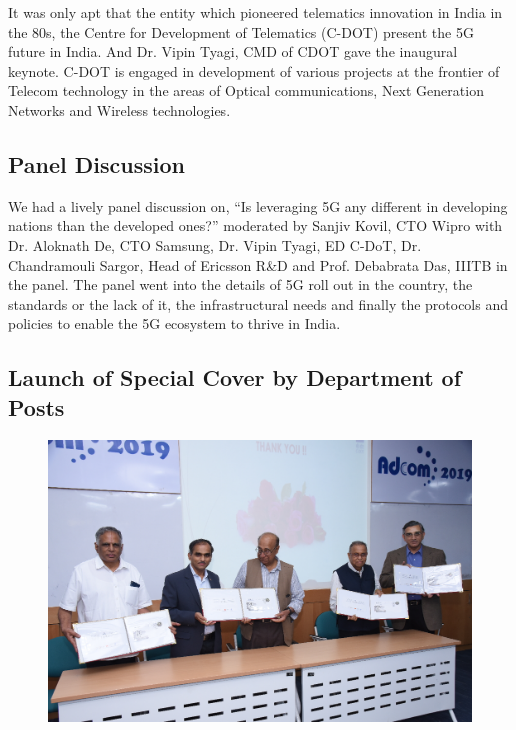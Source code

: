 \begin{multicols}{2}
It was only apt that the entity which pioneered telematics innovation in India in the 80s, the Centre for Development of Telematics (C-DOT) present the 5G future in India. And Dr. Vipin Tyagi, CMD of CDOT gave the inaugural keynote. C-DOT is engaged in development of various projects at the frontier of Telecom technology in the areas of Optical communications, Next Generation Networks and Wireless technologies. 

\subsection*{Panel Discussion}

We had a lively panel discussion on, “Is leveraging 5G any different in developing nations than the developed ones?” moderated by Sanjiv Kovil, CTO Wipro with Dr. Aloknath De, CTO Samsung, Dr. Vipin Tyagi, ED C-DoT, Dr. Chandramouli Sargor, Head of Ericsson R\&D and Prof. Debabrata Das, IIITB in the panel. The panel went into the details of 5G roll out in the country, the standards or the lack of it, the infrastructural needs and finally the protocols and policies to enable the 5G ecosystem to thrive in India.

\vspace{-.3cm}

\noindent
\subsection*{Launch of Special Cover by Department of Posts}

\begin{figure}[H]
\centering
\includegraphics[scale=.88]{src/Figures/events/event-fig07.jpg}
\vspace{-2ex}
\end{figure}


\end{multicols}
